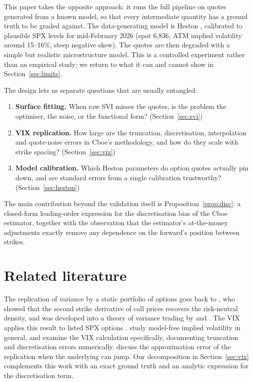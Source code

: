\documentclass[11pt]{article}
\theoremstyle{remark}
\begin{document}
This paper takes the opposite approach: it runs the full pipeline on quotes generated from a known model, so that every intermediate quantity has a ground truth to be graded against.
The data-generating model is Heston \citep{heston1993}, calibrated to plausible SPX levels for mid-February 2026 (spot 6{,}836, ATM implied volatility around 15--16\%, steep negative skew).
The quotes are then degraded with a simple but realistic microstructure model.
This is a controlled experiment rather than an empirical study; we return to what it can and cannot show in Section~\ref{sec:limits}.

The design lets us separate questions that are usually entangled:
\begin{enumerate}
  \item \textbf{Surface fitting.} When raw SVI \citep{gatheral2004} misses the quotes, is the problem the optimiser, the noise, or the functional form? (Section~\ref{sec:svi})
  \item \textbf{VIX replication.} How large are the truncation, discretisation, interpolation and quote-noise errors in Cboe's methodology, and how do they scale with strike spacing? (Section~\ref{sec:vix})
  \item \textbf{Model calibration.} Which Heston parameters do option quotes actually pin down, and are standard errors from a single calibration trustworthy? (Section~\ref{sec:heston})
\end{enumerate}
The main contribution beyond the validation itself is Proposition~\ref{prop:disc}: a closed-form leading-order expression for the discretisation bias of the Cboe estimator, together with the observation that the estimator's at-the-money adjustments exactly remove any dependence on the forward's position between strikes.

\section{Related literature}

The replication of variance by a static portfolio of options goes back to \citet{breedenlitzenberger1978}, who showed that the second strike derivative of call prices recovers the risk-neutral density, and was developed into a theory of variance trading by \citet{carrmadan1998} and \citet{demeterfi1999}.
The VIX applies this result to listed SPX options \citep{cboevix}.
\citet{jiangtian2005} study model-free implied volatility in general, and \citet{jiangtian2007} examine the VIX calculation specifically, documenting truncation and discretisation errors numerically.
\citet{carrwu2009} discuss the approximation error of the replication when the underlying can jump.
Our decomposition in Section~\ref{sec:vix} complements this work with an exact ground truth and an analytic expression for the discretisation term.
\end{document}

